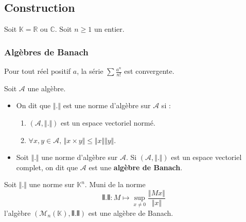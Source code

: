 




  \subsection{Construction}

  Soit $\mathbb{K} = \mathbb{R}$ ou $\mathbb{C}$. Soit $n \geq 1$ un entier.

  \subsubsection{Algèbres de Banach}


  \begin{lemma}
    Pour tout réel positif $a$, la série $\sum \frac{a^n}{n!}$ est convergente.
  \end{lemma}


  \begin{definition}
    Soit $\mathcal{A}$ une algèbre.
    \begin{itemize}
      \item On dit que $\Vert . \Vert$ est une norme d'algèbre sur $\mathcal{A}$ si :
      \begin{enumerate}[label={\bfseries(\roman*)}]
        \item $(\mathcal{A}, \Vert . \Vert)$ est un espace vectoriel normé.
        \item $\forall x, y \in \mathcal{A}, \, \Vert x \times y \Vert \leq \Vert x \Vert \Vert y \Vert$.
      \end{enumerate}
      \item Soit $\Vert . \Vert$ une norme d'algèbre sur $\mathcal{A}$. Si $(\mathcal{A}, \Vert . \Vert)$ est un espace vectoriel complet, on dit que $\mathcal{A}$ est une \textbf{algèbre de Banach}.
    \end{itemize}
  \end{definition}


  \begin{proposition}
    Soit $\Vert . \Vert$ une norme sur $\mathbb{K}^n$. Muni de la norme
    \[ \VERT . \VERT : M \mapsto \sup_{x \neq 0} \frac{\Vert Mx \Vert}{\Vert x \Vert} \]
    l'algèbre $(\mathcal{M}_n(\mathbb{K}), \VERT . \VERT)$ est une algèbre de Banach.
  \end{proposition}


